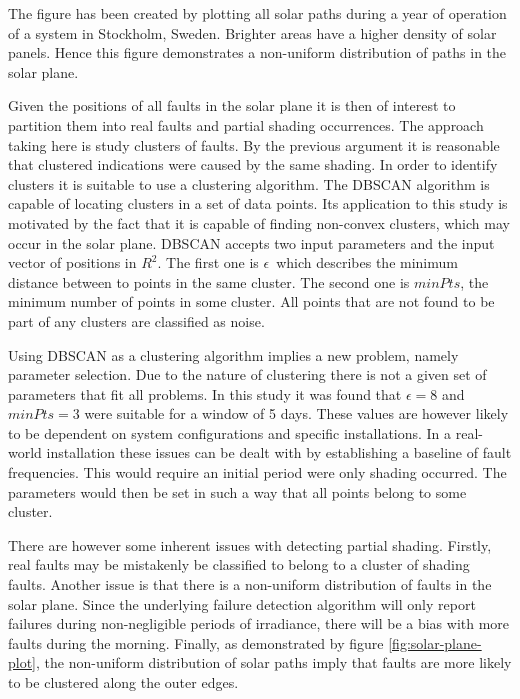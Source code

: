 
The figure has been created by plotting all solar paths during a year of operation of a system in Stockholm, Sweden.
Brighter areas have a higher density of solar panels.
Hence this figure demonstrates a non-uniform distribution of paths in the solar plane.

Given the positions of all faults in the solar plane it is then of interest to partition them into real faults and partial shading occurrences.
The approach taking here is study clusters of faults.
By the previous argument it is reasonable that clustered indications were caused by the same shading.
In order to identify clusters it is suitable to use a clustering algorithm.
The DBSCAN algorithm \cite{Birant2007} is capable of locating clusters in a set of data points.
Its application to this study is motivated by the fact that it is capable of finding non-convex clusters, which may occur in the solar plane.
DBSCAN accepts two input parameters and the input vector of positions in $R^2$.
The first one is $\epsilon$ which describes the minimum distance between to points in the same cluster.
The second one is $minPts$, the minimum number of points in some cluster.
All points that are not found to be part of any clusters are classified as noise.

Using DBSCAN as a clustering algorithm implies a new problem, namely parameter selection.
Due to the nature of clustering there is not a given set of parameters that fit all problems.
In this study it was found that $\epsilon = 8$ and $minPts = 3$ were suitable for a window of 5 days.
These values are however likely to be dependent on system configurations and specific installations.
In a real-world installation these issues can be dealt with by establishing a baseline of fault frequencies.
This would require an initial period were only shading occurred.
The parameters would then be set in such a way that all points belong to some cluster.

There are however some inherent issues with detecting partial shading.
Firstly, real faults may be mistakenly be classified to belong to a cluster of shading faults.
Another issue is that there is a non-uniform distribution of faults in the solar plane.
Since the underlying failure detection algorithm will only report failures during non-negligible periods
of irradiance, there will be a bias with more faults during the morning.
Finally, as demonstrated by figure \ref{fig:solar-plane-plot}, the non-uniform distribution of solar paths imply that 
faults are more likely to be clustered along the outer edges.

